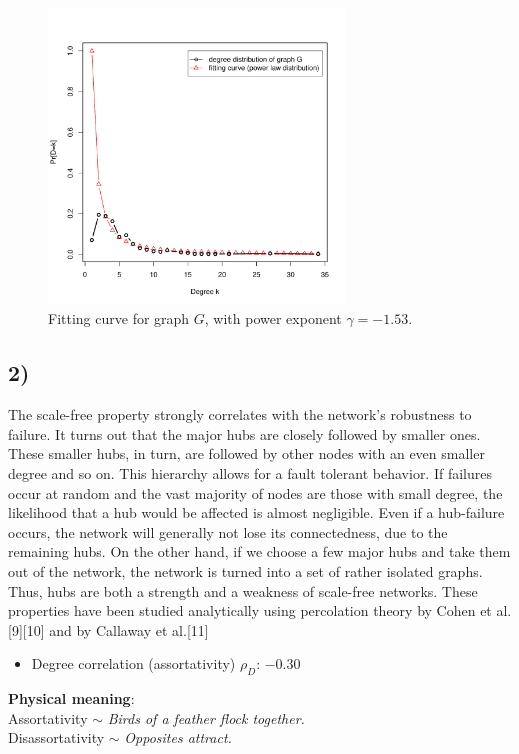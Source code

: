 \documentclass{article}
\begin{document}
\begin{figure}[H]
  \centering
  \includegraphics[width=0.7\textwidth]{fitted_curve}
  \caption{Fitting curve for graph $G$, with power exponent
    $\gamma = - 1.53$.}
  \label{fig:fitted-curve}
\end{figure}

\subsection*{2)}
The scale-free property strongly correlates with the network's
robustness to failure. It turns out that the major hubs are closely
followed by smaller ones. These smaller hubs, in turn, are followed by
other nodes with an even smaller degree and so on. This hierarchy
allows for a fault tolerant behavior. If failures occur at random and
the vast majority of nodes are those with small degree, the likelihood
that a hub would be affected is almost negligible. Even if a
hub-failure occurs, the network will generally not lose its
connectedness, due to the remaining hubs. On the other hand, if we
choose a few major hubs and take them out of the network, the network
is turned into a set of rather isolated graphs. Thus, hubs are both a
strength and a weakness of scale-free networks. These properties have
been studied analytically using percolation theory by Cohen et
al.[9][10] and by Callaway et al.[11]
\begin{itemize}
\item Degree correlation (assortativity) $\rho_D$: $-0.30$
\end{itemize}
\textbf{Physical meaning}:\\
Assortativity $\sim$ \emph{Birds of a feather flock together.}\\
Disassortativity $\sim$ \emph{Opposites attract.}
\end{document}

